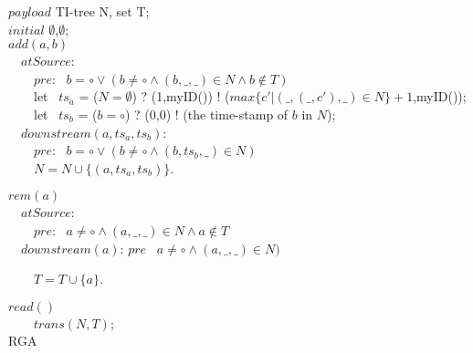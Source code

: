 \renewcommand{\algorithmcfname}{CRDT}
\noindent
\noindent\begin{algorithm}[H]
$\mathit{payload}$ TI-tree N, set T; \\
$\mathit{initial}$ $\emptyset$,$\emptyset$; \\

$add(a,b)$ \\
\ \ $\mathit{atSource}$: \\
\ \ \ \ $\mathit{pre}$: \ $b = \circ \vee ( b \neq \circ \wedge (b,\_,\_) \in N \wedge b \notin T)$ \\



\ \ \ \ let \ $ts_a$ = ($N = \emptyset$) ? (1,myID()) ! ($\mathit{max}\{ c' \vert (\_,(\_,c'),\_) \in N \} +1$,myID()); \\
\ \ \ \ let \ $ts_b$ = ($b = \circ$) ? (0,0) ! (the time-stamp of $b$ in $N$); \\

\ \ $\mathit{downstream}(a,ts_a,ts_b)$: \\
\ \ \ \ $\mathit{pre}$: \ $b = \circ \vee ( b \neq \circ \wedge (b,ts_b,\_) \in N)$ \\

\ \ \ \ $N = N \cup \{ (a,ts_a,ts_b) \}$.


$rem(a)$ \\
\ \ $\mathit{atSource}$: \\
\ \ \ \ $\mathit{pre}$: \ $a \neq \circ \wedge (a,\_,\_) \in N \wedge a \notin T$ \\

\ \ $\mathit{downstream}(a)$: $\mathit{pre}$ \ $a \neq \circ \wedge (a,\_,\_) \in N)$

\ \ \ \ $T = T \cup \{ a \}$.

$read()$ \\
\ \ \ \ \KwRet $\mathit{trans}(N,T)$; \\

\caption{RGA}
\label{Method1}
\end{algorithm}

